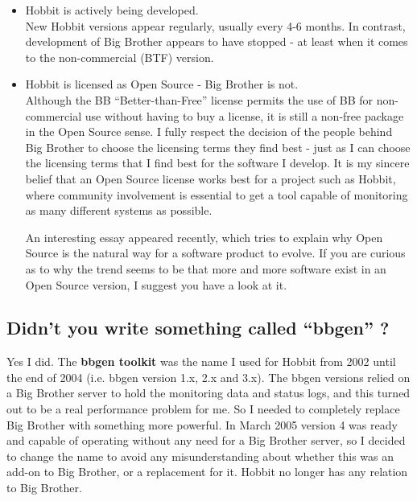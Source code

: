 \begin{itemize}
\item Hobbit is actively being developed.\\ 


 New Hobbit versions appear regularly, usually every 4-6 months. In
 contrast, development of Big Brother appears to have stopped - at
 least when it comes to the non-commercial (BTF) version.


\item Hobbit is licensed as Open Source - Big Brother is not.\\ 


 Although the BB ``Better-than-Free'' license permits the use of BB
 for non-commercial use without having to buy a license, it is still a
 non-free package in the Open Source sense. I fully respect the
 decision of the people behind Big Brother to choose the licensing
 terms they find best - just as I can choose the licensing terms that
 I find best for the software I develop. It is my sincere belief that
 an Open Source license works best for a project such as Hobbit, where
 community involvement is essential to get a tool capable of
 monitoring as many different systems as possible.



 An interesting essay appeared recently, which tries to explain why
 Open Source is the natural way for a software product to evolve. If
 you are curious as to why the trend seems to be that more and more
 software exist in an Open Source version, I suggest you have a look
 at it.



\end{itemize}
\subsection{Didn't you write something called ``bbgen'' ?}


 Yes I did. The \textbf{bbgen toolkit}
 was the name I used for Hobbit from 2002 until the end of 2004 (i.e. bbgen version 1.x, 2.x and 3.x). The bbgen versions relied on a Big Brother server to hold the monitoring data and status logs, and this turned out to be a real performance problem for me. So I needed to completely replace Big Brother with something more powerful. In March 2005 version 4 was ready and capable of operating without any need for a Big Brother server, so I decided to change the name to avoid any misunderstanding about whether this was an add-on to Big Brother, or a replacement for it. Hobbit no longer has any relation to Big Brother.
